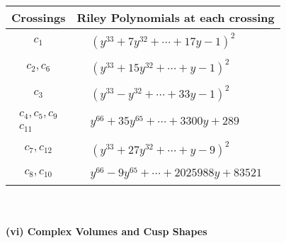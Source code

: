 \documentclass[1p]{elsarticle_modified}
\theoremstyle{definition}
\begin{document}
\begin{tabular}{m{50pt}|m{274pt}}
Crossings & \hspace{64pt}Riley Polynomials at each crossing \\
\hline $$\begin{aligned}c_{1}\end{aligned}$$&$\begin{aligned}
&(y^{33}+7 y^{32}+\cdots+17 y-1)^{2}
\end{aligned}$\\
\hline $$\begin{aligned}c_{2},c_{6}\end{aligned}$$&$\begin{aligned}
&(y^{33}+15 y^{32}+\cdots+y-1)^{2}
\end{aligned}$\\
\hline $$\begin{aligned}c_{3}\end{aligned}$$&$\begin{aligned}
&(y^{33}- y^{32}+\cdots+33 y-1)^{2}
\end{aligned}$\\
\hline $$\begin{aligned}c_{4},c_{5},c_{9}\\c_{11}\end{aligned}$$&$\begin{aligned}
&y^{66}+35 y^{65}+\cdots+3300 y+289
\end{aligned}$\\
\hline $$\begin{aligned}c_{7},c_{12}\end{aligned}$$&$\begin{aligned}
&(y^{33}+27 y^{32}+\cdots+y-9)^{2}
\end{aligned}$\\
\hline $$\begin{aligned}c_{8},c_{10}\end{aligned}$$&$\begin{aligned}
&y^{66}-9 y^{65}+\cdots+2025988 y+83521
\end{aligned}$\\
\hline
\end{tabular}\\~\\
\newpage\flushleft \textbf{(vi) Complex Volumes and Cusp Shapes}
\end{document}
